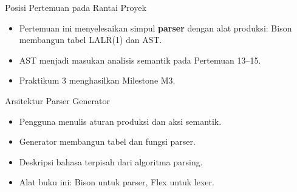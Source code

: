 \documentclass[aspectratio=169,10pt,t]{beamer}
\begin{document}
\begin{frame}{Posisi Pertemuan pada Rantai Proyek}

  \vspace{2pt}
  \begin{itemize}
    \item Pertemuan ini menyelesaikan simpul \textbf{parser} dengan
          alat produksi: Bison membangun tabel LALR(1) dan AST.
    \item AST menjadi masukan analisis semantik pada Pertemuan 13--15.
    \item Praktikum 3 menghasilkan Milestone M3.
  \end{itemize}
\end{frame}

\begin{frame}{Arsitektur Parser Generator}
  \begin{center}
  \end{center}

  \begin{itemize}
    \item Pengguna menulis aturan produksi dan aksi semantik.
    \item Generator membangun tabel dan fungsi parser.
    \item Deskripsi bahasa terpisah dari algoritma parsing.
    \item Alat buku ini: Bison untuk parser, Flex untuk lexer.
  \end{itemize}
\end{frame}
\end{document}
